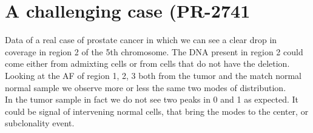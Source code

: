 \section{A challenging case (PR-2741}
Data of a real case of prostate cancer in which we can see a clear drop in coverage in region 2 of the 5th chromosome. The DNA present in region 2 could come either from admixting cells or from cells that do not have the deletion. \\
Looking at the AF of region 1, 2, 3 both from the tumor and the match normal normal sample we observe more or less the same two modes of distribution.\\
In the tumor sample in fact we do not see two peaks in 0 and 1 as expected. It could be signal of intervening normal cells, that bring the modes to the center, or subclonality event. \\


























